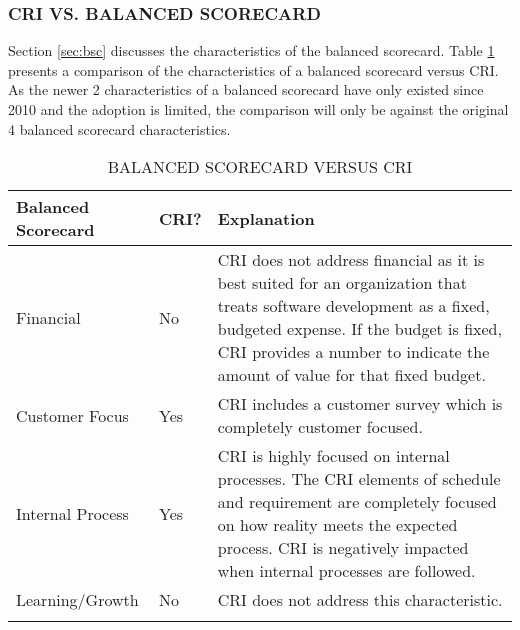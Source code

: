 \documentclass[SDSUThesis.tex]{subfiles}
\begin{document}
        
        \subsubsection{CRI VS. BALANCED SCORECARD}
            Section \ref{sec:bsc} discusses the characteristics of the 
            balanced scorecard.  Table \ref{tab:bsc} presents a
            comparison of the characteristics of a balanced scorecard
            versus CRI.
            As the newer 2 characteristics of a balanced scorecard
            have only existed since 2010 and the adoption is limited,
            the comparison will only be against the original 4 balanced
            scorecard characteristics.
            
             \begin{longtable}{p{3cm}p{1cm}p{10cm}}
                
                \toprule%
                 \centering%
                 {\bfseries Balanced Scorecard}
                 & {\bfseries CRI?} 
                 & {\bfseries Explanation} \\
                
                \cmidrule[0.4pt](r{0.125em}){1-1}%
                \cmidrule[0.4pt](lr{0.125em}){2-2}%
                \cmidrule[0.4pt](lr{0.125em}){3-3}%
                \endhead
                
                Financial & No & CRI does not address financial as it is best suited 
                    for an organization that treats software development as a fixed,
                    budgeted expense. If the budget is fixed, CRI provides a number
                    to indicate the amount of value for that fixed budget.  \\
                \myrowcolour%
                Customer Focus & Yes & CRI includes a customer survey which is 
                    completely customer focused.\\
                Internal Process & Yes & CRI is highly focused on internal processes.
                    The CRI elements of schedule and requirement are completely
                    focused on how reality meets the expected process. CRI is
                    negatively impacted when internal processes are followed. \\
                \myrowcolour%
                Learning/Growth & No & CRI does not address this characteristic. \\
                
                \bottomrule
                
                \caption{BALANCED SCORECARD VERSUS CRI}
                \label{tab:bsc}
            \end{longtable}
\end{document}
